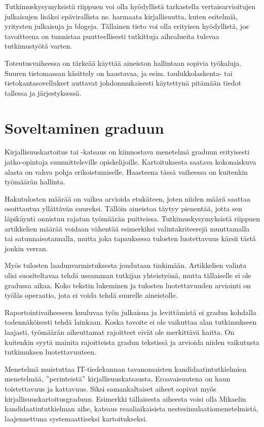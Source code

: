 \documentclass{article}
\begin{document}
Tutkimuskysymyksistä riippuen voi olla hyödyllistä tarkastella
vertaisarvioitujen julkaisujen lisäksi epävirallista ns. harmaata
kirjallisuutta, kuten esitelmiä, yritysten julkaisuja ja blogeja. Tällainen
tieto voi olla erityisen hyödyllistä, jos tavoitteena on tunnistaa
puutteellisesti tutkittuja aihealueita tulevaa tutkimustyötä varten.

Toteutusvaiheessa on tärkeää käyttää aineiston hallintaan sopivia työkaluja.
Suuren tietomassan käsittely on haastavaa, ja esim. taulukkolaskenta-
tai tietokantasovellukset auttavat johdonmukaisesti käytettynä pitämään
tiedot tallessa ja järjestyksessä.

\section*{Soveltaminen graduun}

Kirjallisuuskartoitus tai -katsaus on kiinnostava menetelmä graduun
erityisesti jatko-opintoja suunnitteleville opiskelijoille. Kartoituksesta
saatava kokonaiskuva alasta on vahva pohja erikoistumiselle. Haasteena
tässä vaiheessa on kuitenkin työmäärän hallinta.

Hakutulosten määrää on vaikea arvioida etukäteen, joten niiden määrä saattaa
osoittautua yllättävän suureksi. Tällöin aineistoa täytyy pienentää, jotta sen
läpikäynti onnistuu rajatun työmäärän puitteissa. Tutkimuskysymyksistä riippuen
artikkelien määrää voidaan vähentää esimerkiksi valintakriteerejä muuttamalla
tai satunnaisotannalla, mutta joka tapauksessa tulosten luotettavuus kärsii
tästä jonkin verran.

Myös tulosten laadunvarmistuksesta joudutaan tinkimään. Artikkelien valinta
olisi suositeltavaa tehdä useamman tutkijan yhteistyönä, mutta tällaiselle ei
ole gradussa aikaa. Koko tekstin lukeminen ja tulosten luotettavuuden arviointi
on työläs operaatio, jota ei voida tehdä suurelle aineistolle.

Raportointivaiheeseen kuuluvaa työn julkaisua ja levittämistä ei gradun
kohdalla todennäköisesti tehdä lainkaan. Koska tavoite ei ole vaikuttaa alan
tutkimukseen laajasti, työmäärän aiheuttamat rajoitteet eivät ole merkittävä
haitta. On kuitenkin syytä mainita rajoitteista gradun tekstissä ja arvioida
niiden vaikutusta tutkimuksen luotettavuuteen.

Menetelmä muistuttaa IT-tiedekunnan tavanomaisten kandidaatintutkielmien
menetelmää, ''perinteistä'' kirjallisuuskatsausta. Eroavaisuutena on haun
toistettavuus ja kattavuus. Siksi samankaltaiset aiheet sopivat myös
kirjallisuuskartoitusgraduun. Esimerkki tällaisesta aiheesta voisi olla
Mikaelin kandidaatintutkielman aihe, katsaus reaaliaikaisista
nestesimulaatiomenetelmistä, laajennettuna systemaattiseksi kartoitukseksi.
\end{document}
